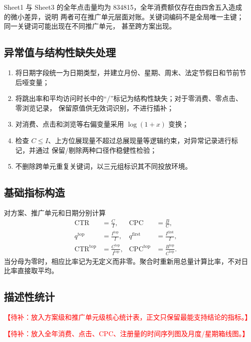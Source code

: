 \documentclass[UTF8,a4paper,zihao=-4]{ctexart}
\newcommand{\placeholder}[1]{\textcolor{red}{【待补：#1】}}
\begin{document}
Sheet1 与 Sheet3 的全年点击量均为 834815，全年消费额仅存在由四舍五入造成的微小差异，说明
两者可在推广单元层面对账。关键词编码不是全局唯一主键；同一关键词可能出现在不同推广单元，
甚至跨方案出现。

\subsection{异常值与结构性缺失处理}

\begin{enumerate}
  \item 将日期字段统一为日期类型，并建立月份、星期、周末、法定节假日和节前节后哑变量；
  \item 将跳出率和平均访问时长中的“/”标记为结构性缺失；对于零消费、零点击、零浏览记录，
  保留原值供无效词识别，不进行插补；
  \item 对消费、点击和浏览等右偏变量采用 $\log(1+x)$ 变换；
  \item 检查 $C\leq I$、上方位展现量不超过总展现量等逻辑约束，对异常记录进行标记，并通过
  保留/剔除两种口径作稳健性检验；
  \item 不删除跨单元重复关键词，以三元组标识其不同投放环境。
\end{enumerate}

\subsection{基础指标构造}

对方案、推广单元和日期分别计算
\begin{align}
  \mathrm{CTR}&=\frac{C}{I}, &
  \mathrm{CPC}&=\frac{B}{C},\\
  q^{\mathrm{top}}&=\frac{I^{\mathrm{top}}}{I}, &
  q^{\mathrm{first}}&=\frac{I^{\mathrm{first}}}{I},\\
  \mathrm{CTR}^{\mathrm{top}}&=\frac{C^{\mathrm{top}}}{I^{\mathrm{top}}}, &
  \mathrm{CPC}^{\mathrm{top}}&=\frac{B^{\mathrm{top}}}{C^{\mathrm{top}}}.
\end{align}
当分母为零时，相应比率记为无定义而非零。聚合时重新用总量计算比率，不对日比率直接取平均。

\subsection{描述性统计}

\placeholder{放入方案级和推广单元级核心统计表，正文只保留最能支持结论的指标。}

\placeholder{放入全年消费、点击、CPC、注册量的时间序列图及月度/星期箱线图。}
\end{document}
